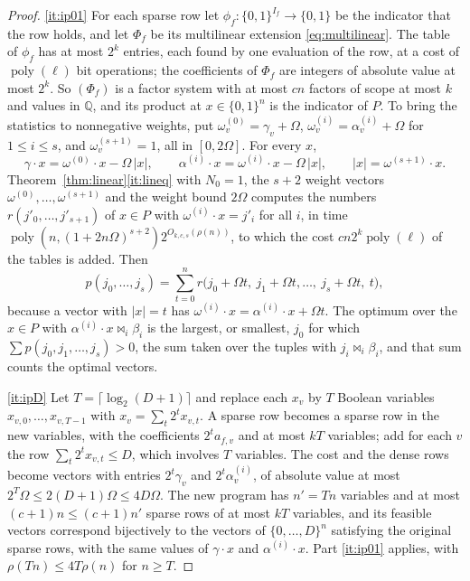 \documentclass[11pt,reqno]{amsart}
\numberwithin{equation}{section}
\theoremstyle{plain}
\theoremstyle{definition}
\theoremstyle{remark}
\DeclareMathOperator{\poly}{poly}
\newcommand{\Q}{\mathbb{Q}}
\newcommand{\rhon}{\rho}
\begin{document}
\begin{proof}
\ref{it:ip01} For each sparse row let $\phi_f:\{0,1\}^{I_f}\to\{0,1\}$ be the
indicator that the row holds, and let $\Phi_f$ be its multilinear extension
\eqref{eq:multilinear}. The table of $\phi_f$ has at most $2^k$ entries, each
found by one evaluation of the row, at a cost of $\poly(\ell)$ bit operations;
the coefficients of $\Phi_f$ are integers of absolute value at most $2^k$. So
$(\Phi_f)$ is a factor system with at most $cn$ factors of scope at most $k$
and values in $\Q$, and its product at $x\in\{0,1\}^n$ is the indicator of $P$.
To bring the statistics to nonnegative weights, put
$\omega^{(0)}_v=\gamma_v+\Omega$, $\omega^{(i)}_v=\alpha^{(i)}_v+\Omega$ for
$1\le i\le s$, and $\omega^{(s+1)}_v=1$, all in $[0,2\Omega]$. For every $x$,
\[
  \gamma\cdot x=\omega^{(0)}\cdot x-\Omega\,|x|,\qquad
  \alpha^{(i)}\cdot x=\omega^{(i)}\cdot x-\Omega\,|x|,\qquad |x|=\omega^{(s+1)}\cdot x .
\]
Theorem~\ref{thm:linear}\ref{it:lineq} with $N_0=1$, the $s+2$ weight vectors
$\omega^{(0)},\dots,\omega^{(s+1)}$ and the weight bound $2\Omega$ computes the
numbers $r(j'_0,\dots,j'_{s+1})$ of $x\in P$ with $\omega^{(i)}\cdot x=j'_i$ for
all $i$, in time $\poly(n,(1+2n\Omega)^{s+2})2^{O_{k,c,s}(\rhon(n))}$, to which
the cost $cn2^k\poly(\ell)$ of the tables is added. Then
\[
  p(j_0,\dots,j_s)=\sum_{t=0}^{n}r\bigl(j_0+\Omega t,\ j_1+\Omega t,\dots,\ j_s+\Omega t,\ t\bigr),
\]
because a vector with $|x|=t$ has $\omega^{(i)}\cdot x=\alpha^{(i)}\cdot x+\Omega t$.
The optimum over the $x\in P$ with $\alpha^{(i)}\cdot x\bowtie_i\beta_i$ is the
largest, or smallest, $j_0$ for which $\sum p(j_0,j_1,\dots,j_s)>0$, the sum
taken over the tuples with $j_i\bowtie_i\beta_i$, and that sum counts the
optimal vectors.

\ref{it:ipD} Let $T=\lceil\log_2(D+1)\rceil$ and replace each $x_v$ by $T$
Boolean variables $x_{v,0},\dots,x_{v,T-1}$ with $x_v=\sum_t2^tx_{v,t}$. A sparse
row becomes a sparse row in the new variables, with the coefficients
$2^ta_{f,v}$ and at most $kT$ variables; add for each $v$ the row
$\sum_t2^tx_{v,t}\le D$, which involves $T$ variables. The cost and the dense
rows become vectors with entries $2^t\gamma_v$ and $2^t\alpha^{(i)}_v$, of
absolute value at most $2^T\Omega\le2(D+1)\Omega\le4D\Omega$. The new program
has $n'=Tn$ variables and at most $(c+1)n\le(c+1)n'$ sparse rows of at most $kT$
variables, and its feasible vectors correspond bijectively to the vectors of
$\{0,\dots,D\}^n$ satisfying the original sparse rows, with the same values of
$\gamma\cdot x$ and $\alpha^{(i)}\cdot x$. Part \ref{it:ip01} applies, with
$\rhon(Tn)\le4T\rhon(n)$ for $n\ge T$.
\end{proof}
\end{document}
